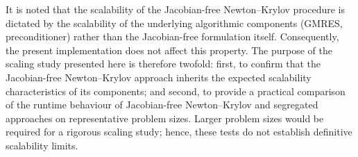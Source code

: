 \documentclass[sn-mathphys,Numbered]{sn-jnl}%
\begin{document}
It is noted that the scalability of the Jacobian-free Newton–Krylov procedure is dictated by the scalability of the underlying algorithmic components (GMRES, preconditioner) rather than the Jacobian-free formulation itself. Consequently, the present implementation does not affect this property. The purpose of the scaling study presented here is therefore twofold: first, to confirm that the Jacobian-free Newton–Krylov approach inherits the expected scalability characteristics of its components; and second, to provide a practical comparison of the runtime behaviour of Jacobian-free Newton–Krylov and segregated approaches on representative problem sizes.
Larger problem sizes would be required for a rigorous scaling study; hence, these tests do not establish definitive scalability limits.

%
\end{document}
